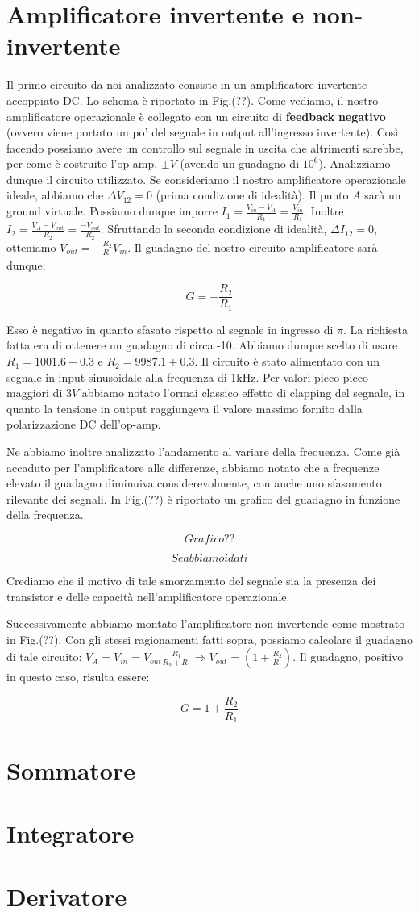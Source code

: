 \section{Amplificatore invertente e non-invertente}
Il primo circuito da noi analizzato consiste in un amplificatore invertente accoppiato DC. Lo schema è riportato in Fig.(??). Come vediamo, il nostro amplificatore operazionale è collegato con un circuito di \textbf{feedback} \textbf{negativo} (ovvero viene portato un po' del segnale in output all'ingresso invertente). Così facendo possiamo avere un controllo sul segnale in uscita che altrimenti sarebbe, per come è costruito l'op-amp, $\pm V$ (avendo un guadagno di $10^6$). Analizziamo dunque il circuito utilizzato. Se consideriamo il nostro amplificatore operazionale ideale, abbiamo che $\Delta V_{12}=0$ (prima condizione di idealità). Il punto $A$ sarà un ground virtuale. Possiamo dunque imporre $I_1=\frac{V_{in}-V_A}{R_1}=\frac{V_{in}}{R_1}$.  Inoltre $I_2=\frac{V_A-V_{out}}{R_2}=\frac{-V_{out}}{R_2}$.
Sfruttando la seconda condizione di idealità, $\Delta I_{12}=0$, otteniamo $V_{out}=-\frac{R_2}{R_1} V_{in}$. Il guadagno del nostro circuito amplificatore sarà dunque:

$$G=-\frac{R_2}{R_1}$$


Esso è negativo in quanto sfasato rispetto al segnale in ingresso di $\pi$.
La richiesta fatta era di ottenere un guadagno di circa -10. Abbiamo dunque scelto di usare $R_1=1001.6\pm0.3$ e $R_2=9987.1\pm0.3$. Il circuito è stato alimentato con un segnale in input sinusoidale alla frequenza di 1kHz. Per valori picco-picco maggiori di $3V$ abbiamo notato l'ormai classico effetto di clapping del segnale, in quanto la tensione in output raggiungeva il valore massimo fornito dalla polarizzazione DC dell'op-amp. 

Ne abbiamo inoltre analizzato l'andamento al variare della frequenza. Come già accaduto per l'amplificatore alle differenze, abbiamo notato che a frequenze elevato il guadagno diminuiva considerevolmente, con anche uno sfasamento rilevante dei segnali. In Fig.(??) è riportato un grafico del guadagno in funzione della frequenza. 

$$Grafico??$$

$$Se abbiamo i dati$$


Crediamo che il motivo di tale smorzamento del segnale sia la presenza dei transistor e delle capacità nell'amplificatore operazionale.


Successivamente abbiamo montato l'amplificatore non invertende come mostrato in Fig.(??). Con gli stessi ragionamenti fatti sopra, possiamo calcolare il guadagno di tale circuito: $V_A=V_{in}=V_{out}\frac{R_1}{R_2+R_1} \Rightarrow V_{out}=(1+\frac{R_2}{R_1})$. Il guadagno, positivo in questo caso, risulta essere: 

$$G=1+\frac{R_2}{R_1}$$





\section{Sommatore}


\section{Integratore}


\section{Derivatore}